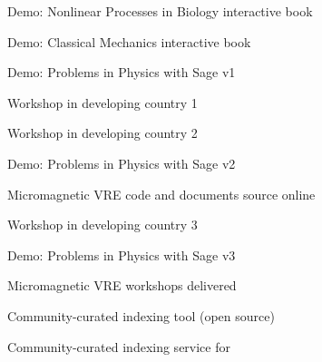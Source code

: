 \begin{workpackage}
\begin{wpdelivs}
 \begin{wpdeliv}[due=36,id=ibook2,dissem=PU,nature=DEM]{Demo: Nonlinear Processes in Biology  interactive book} \end{wpdeliv}


 \begin{wpdeliv}[due=40,id=ibook2,dissem=PU,nature=DEM]{Demo: Classical Mechanics interactive book} \end{wpdeliv}

 \begin{wpdeliv}[due=12,id=ibook3a,dissem=PU,nature=DEM]{Demo: Problems in Physics with Sage v1} \end{wpdeliv}
 \begin{wpdeliv}[due=12,id=developing-countries1,dissem=PU,nature=DEM,lead=UB]{Workshop in developing country 1} \end{wpdeliv}
 \begin{wpdeliv}[due=24,id=developing-countries2,dissem=PU,nature=DEM,lead=UB]{Workshop in developing country 2} \end{wpdeliv}
 \begin{wpdeliv}[due=30,id=ibook3b,dissem=PU,nature=DEM]{Demo: Problems in Physics with Sage v2} \end{wpdeliv}
 \begin{wpdeliv}[due=32,id=oommfnb-source-and-testing-setup,dissem=PU,nature=DEC,lead=USO]{Micromagnetic
     VRE code and documents source online} \end{wpdeliv}
 \begin{wpdeliv}[due=36,id=developing-countries3,dissem=PU,nature=DEM,lead=UB]{Workshop in developing country 3} \end{wpdeliv}
 \begin{wpdeliv}[due=44,id=ibook3c,dissem=PU,nature=DEM]{Demo: Problems in Physics with Sage v3} \end{wpdeliv}
 \begin{wpdeliv}[due=44,id=oommfnb-workshops,dissem=PU,nature=OTHER,lead=USO]{Micromagnetic
     VRE workshops delivered} \end{wpdeliv}
 \begin{wpdeliv}[due=24,id=ils-tool,dissem=PU,nature=P,lead=UV]{Community-curated
     indexing tool (open source)} \end{wpdeliv}
 \begin{wpdeliv}[due=24,id=ils-service,dissem=PU,nature=DEM,lead=UV]{Community-curated
     indexing service for \TheProject} \end{wpdeliv}

\end{wpdelivs}
\end{workpackage}

